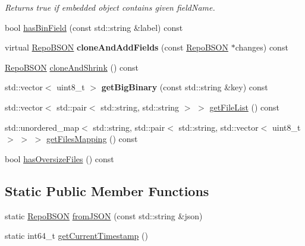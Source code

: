 \begin{DoxyCompactItemize}
\begin{DoxyCompactList}\small\item\em Returns true if embedded object contains given field\+Name. \end{DoxyCompactList}\item 
bool \hyperlink{classrepo_1_1core_1_1model_1_1_repo_b_s_o_n_a0ad5a02a94a02313e22bd8826c1db8cc}{has\+Bin\+Field} (const std\+::string \&label) const 
\item 
\hypertarget{classrepo_1_1core_1_1model_1_1_repo_b_s_o_n_a08eb34b8ed7ecb5546e6f99e4708c3be}{}virtual \hyperlink{classrepo_1_1core_1_1model_1_1_repo_b_s_o_n}{Repo\+B\+S\+O\+N} {\bfseries clone\+And\+Add\+Fields} (const \hyperlink{classrepo_1_1core_1_1model_1_1_repo_b_s_o_n}{Repo\+B\+S\+O\+N} $\ast$changes) const \label{classrepo_1_1core_1_1model_1_1_repo_b_s_o_n_a08eb34b8ed7ecb5546e6f99e4708c3be}

\item 
\hyperlink{classrepo_1_1core_1_1model_1_1_repo_b_s_o_n}{Repo\+B\+S\+O\+N} \hyperlink{classrepo_1_1core_1_1model_1_1_repo_b_s_o_n_ac4825e1c7c40c46fc9f5b1ba2ff1e8bf}{clone\+And\+Shrink} () const 
\item 
\hypertarget{classrepo_1_1core_1_1model_1_1_repo_b_s_o_n_ab47dba25bea609596e1201d65163df80}{}std\+::vector$<$ uint8\+\_\+t $>$ {\bfseries get\+Big\+Binary} (const std\+::string \&key) const \label{classrepo_1_1core_1_1model_1_1_repo_b_s_o_n_ab47dba25bea609596e1201d65163df80}

\item 
std\+::vector$<$ std\+::pair$<$ std\+::string, std\+::string $>$ $>$ \hyperlink{classrepo_1_1core_1_1model_1_1_repo_b_s_o_n_af6fcb689bfd5fb93e43a3e6879332fbb}{get\+File\+List} () const 
\item 
std\+::unordered\+\_\+map$<$ std\+::string, std\+::pair$<$ std\+::string, std\+::vector$<$ uint8\+\_\+t $>$ $>$ $>$ \hyperlink{classrepo_1_1core_1_1model_1_1_repo_b_s_o_n_ae61dbbcf6f836bffda5f5bb6cd596145}{get\+Files\+Mapping} () const 
\item 
bool \hyperlink{classrepo_1_1core_1_1model_1_1_repo_b_s_o_n_a75e57c9424a02f7e71ff755bc06d933b}{has\+Oversize\+Files} () const 
\end{DoxyCompactItemize}
\subsection*{Static Public Member Functions}
\begin{DoxyCompactItemize}
\item 
static \hyperlink{classrepo_1_1core_1_1model_1_1_repo_b_s_o_n}{Repo\+B\+S\+O\+N} \hyperlink{classrepo_1_1core_1_1model_1_1_repo_b_s_o_n_ab46a47cac46bc975bf6fde6702ba0f7d}{from\+J\+S\+O\+N} (const std\+::string \&json)
\item 
static int64\+\_\+t \hyperlink{classrepo_1_1core_1_1model_1_1_repo_b_s_o_n_a2c7f83c92e6a293162ccc6814bf0aa9c}{get\+Current\+Timestamp} ()
\end{DoxyCompactItemize}
